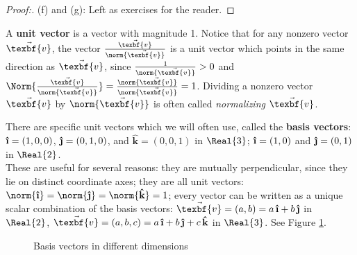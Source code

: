 \begin{proofbar}
\begin{proof}[Proof:]
 \par\noindent(f) and (g): Left as exercises for the reader.\vspace{-3mm}
\end{proof}\end{proofbar}

A \textbf{unit vector} is a vector with magnitude 1.
Notice that for any nonzero vector $\vec{\texbf{v}}$, the vector $\frac{\vec{\texbf{v}}}{\norm{\vec{\texbf{v}}}}$ is a unit vector which
points in the same direction as $\vec{\texbf{v}}$, since $\frac{1}{\norm{\vec{\texbf{v}}}} > 0$ and
$\Norm{\frac{\vec{\texbf{v}}}{\norm{\vec{\texbf{v}}}}} = \frac{\norm{\vec{\texbf{v}}}}{\norm{\vec{\texbf{v}}}} = 1$. Dividing a nonzero
vector $\vec{\texbf{v}}$ by $\norm{\vec{\texbf{v}}}$ is often called \emph{normalizing} $\vec{\texbf{v}}$.

There are specific unit vectors which we will often use, called the \textbf{basis vectors}:\\
$\boldsymbol{\hat{\textbf{\i}}} = (1,0,0)$, $\boldsymbol{\hat{\textbf{\j}}} = (0,1,0)$, and $\boldsymbol{\hat{\textbf{k}}} = (0,0,1)$ in $\Real{3}$;
$\boldsymbol{\hat{\textbf{\i}}} = (1,0)$ and $\boldsymbol{\hat{\textbf{\j}}} = (0,1)$ in $\Real{2}$. \\These are useful for several reasons: they are mutually
perpendicular, since they lie on distinct coordinate axes; they are all unit vectors: $\norm{\boldsymbol{\hat{\textbf{\i}}}} =
\norm{\boldsymbol{\hat{\textbf{\j}}}} = \norm{\boldsymbol{\hat{\textbf{k}}}} = 1$; every vector can be written as a unique scalar combination of the basis
vectors:
$\vec{\texbf{v}} = (a,b) = a\,\boldsymbol{\hat{\textbf{\i}}} + b\,\boldsymbol{\hat{\textbf{\j}}}$ in $\Real{2}$, $\vec{\texbf{v}} = (a,b,c) = a\,\boldsymbol{\hat{\textbf{\i}}} +
b\,\boldsymbol{\hat{\textbf{\j}}} + c\,\boldsymbol{\hat{\textbf{k}}}$ in $\Real{3}$. See Figure \ref{fig:basis}.

\begin{figure}[h]
 \centering
 \quad
 \quad
 \quad
 \caption[]{\quad Basis vectors in different dimensions}
 \label{fig:basis}
\end{figure}

